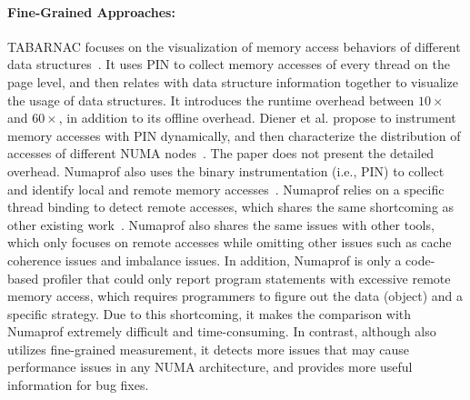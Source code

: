 \paragraph{Fine-Grained Approaches:} 
TABARNAC focuses on the visualization of memory access behaviors of different data structures~\cite{TABARNAC}. It uses PIN to collect memory accesses of every thread on the page level, and then relates with data structure information together to visualize the usage of data structures. It introduces the runtime overhead between $10\times$ and $60\times$, in addition to its offline overhead. Diener et al. propose to instrument memory accesses with PIN dynamically, and then characterize the distribution of accesses of different NUMA nodes~\cite{diener2015characterizing}. The paper does not present the detailed overhead. 
Numaprof also uses the binary instrumentation  (i.e., PIN) to collect and identify local and remote memory accesses~\cite{valat:2018:numaprof}. 
Numaprof relies on a specific thread binding to detect remote accesses, which shares the same shortcoming as other existing work~\cite{XuNuma, 7847070}. 
Numaprof also shares the same issues with other tools, which only focuses on remote accesses while omitting other issues such as cache coherence issues and imbalance issues. 
In addition, Numaprof is only a code-based profiler that could only report program statements with excessive remote memory access, which requires programmers to figure out the data (object) and a specific strategy. Due to this shortcoming, it makes the comparison with Numaprof extremely difficult and time-consuming. 
In contrast, although \NP{} also utilizes fine-grained measurement, it detects more issues that may cause performance issues in any NUMA architecture, and provides more useful information for bug fixes.    




